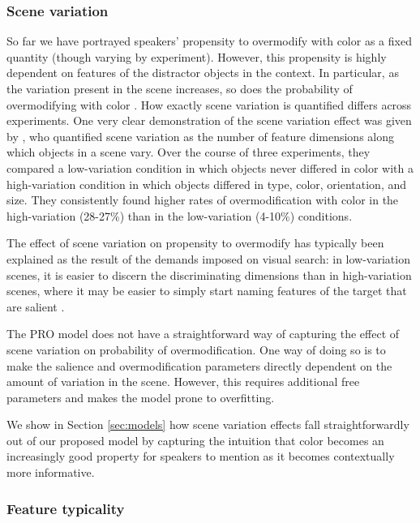 \documentclass[11pt]{article}
\newcommand{\sectionref}[1]{Section \ref{#1}}
\begin{document}
\subsubsection{Scene variation}
\label{sec:scenevariation}

So far we have portrayed speakers' propensity to overmodify with color as a fixed quantity (though varying by experiment). However, this propensity is highly dependent on features of the distractor objects in the context. In particular, as the variation present in the scene increases, so does the probability of overmodifying with color \cite{Davies2013, Koolen2013}. How exactly scene variation is quantified differs across experiments. One very clear demonstration of the scene variation effect was given by , who quantified scene variation as the number of feature dimensions along which objects in a scene vary. Over the course of three experiments, they compared a low-variation condition in which objects never differed in color with a high-variation condition in which objects differed in type, color, orientation, and size. They consistently found higher rates of overmodification with color in the high-variation (28-27\%) than in the low-variation (4-10\%) conditions.

The effect of scene variation on propensity to overmodify has typically been explained as the result of the demands imposed on visual search: in low-variation scenes, it is easier to discern the discriminating dimensions than in high-variation scenes, where it may be easier to simply start naming features of the target that are salient \cite{Koolen2013}. 

The PRO model does not have a straightforward way of capturing the effect of scene variation on probability of overmodification. One way of doing so is to make the salience and overmodification parameters directly dependent on the amount of variation in the scene. However, this requires additional free parameters and makes the model prone to overfitting.

We show in \sectionref{sec:models} how scene variation effects fall straightforwardly out of our proposed model by capturing the intuition that color becomes an increasingly good property for speakers to mention as it becomes contextually more informative.

\subsubsection{Feature typicality}
\label{sec:colortypicalityintro}
\end{document}
